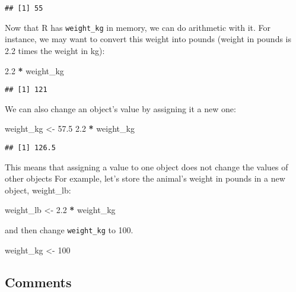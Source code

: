 \documentclass[]{book}
\newenvironment{Shaded}{\begin{snugshade}}{\end{snugshade}}
\newcommand{\DecValTok}[1]{\textcolor[rgb]{0.00,0.00,0.81}{#1}}
\newcommand{\FloatTok}[1]{\textcolor[rgb]{0.00,0.00,0.81}{#1}}
\newcommand{\StringTok}[1]{\textcolor[rgb]{0.31,0.60,0.02}{#1}}
\newcommand{\OperatorTok}[1]{\textcolor[rgb]{0.81,0.36,0.00}{\textbf{#1}}}
\newcommand{\NormalTok}[1]{#1}
\begin{document}
\begin{verbatim}
## [1] 55
\end{verbatim}

Now that R has \texttt{weight\_kg} in memory, we can do arithmetic with
it. For instance, we may want to convert this weight into pounds (weight
in pounds is 2.2 times the weight in kg):

\begin{Shaded}
\begin{Highlighting}[]
\FloatTok{2.2} \OperatorTok{*}\StringTok{ }\NormalTok{weight_kg}
\end{Highlighting}
\end{Shaded}

\begin{verbatim}
## [1] 121
\end{verbatim}

We can also change an object's value by assigning it a new one:

\begin{Shaded}
\begin{Highlighting}[]
\NormalTok{weight_kg <-}\StringTok{ }\FloatTok{57.5}
\FloatTok{2.2} \OperatorTok{*}\StringTok{ }\NormalTok{weight_kg}
\end{Highlighting}
\end{Shaded}

\begin{verbatim}
## [1] 126.5
\end{verbatim}

This means that assigning a value to one object does not change the
values of other objects For example, let's store the animal's weight in
pounds in a new object, weight\_lb:

\begin{Shaded}
\begin{Highlighting}[]
\NormalTok{weight_lb <-}\StringTok{ }\FloatTok{2.2} \OperatorTok{*}\StringTok{ }\NormalTok{weight_kg}
\end{Highlighting}
\end{Shaded}

and then change \texttt{weight\_kg} to 100.

\begin{Shaded}
\begin{Highlighting}[]
\NormalTok{weight_kg <-}\StringTok{ }\DecValTok{100}
\end{Highlighting}
\end{Shaded}

\subsection{Comments}\label{comments}
\end{document}
